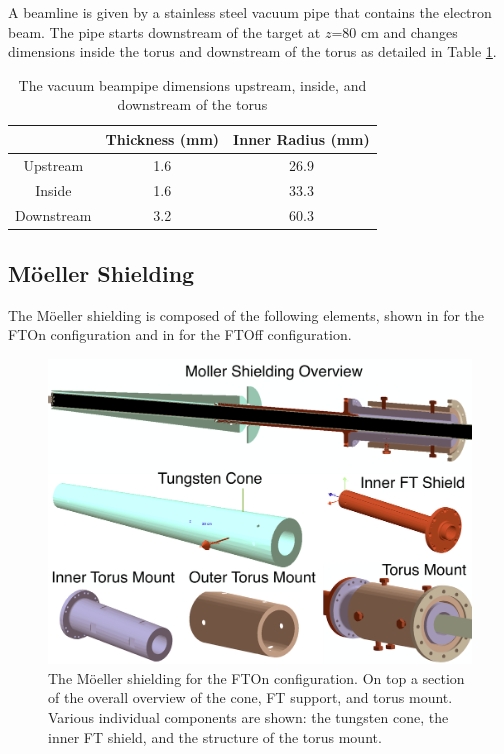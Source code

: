 A beamline is given by a stainless steel vacuum pipe that contains the electron beam.
The pipe starts downstream of the target at $z$=80 cm and changes dimensions inside
the torus and downstream of the torus as detailed in Table \ref{tab:beampipe}.

\begin{table}[h]
	\begin{center}
		\begin{tabular}{| c | c | c |}
			\hline \hline
			                & Thickness (mm) & Inner Radius (mm)   \\
			\hline
              Upstream      &    1.6     &    26.9 \\
              Inside        &    1.6     &    33.3 \\
            Downstream      &    3.2     &    60.3 \\
			\hline \hline
		\end{tabular}
	\end{center}
	\caption{The vacuum beampipe dimensions upstream, inside, and downstream of the torus}\label{tab:beampipe}
\end{table}


\subsection{M\"oeller Shielding}
The M\"oeller shielding is composed of the following elements, shown in  for the FTOn configuration
and in  for the FTOff configuration.

\begin{figure}
	\centering
	\includegraphics[width=0.99\columnwidth,keepaspectratio]{img/moellerShieldingFTOn.png}
	\caption{The M\"oeller shielding for the FTOn configuration. On top a section of the overall overview of the cone, FT support, and torus mount.
		     Various individual components are shown: the tungsten cone, the inner FT shield, and the structure of the torus mount.}
	\label{fig:moellerShieldingFTOn}
\end{figure}


